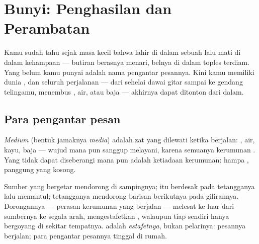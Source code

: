 \chapter{Bunyi: Penghasilan dan Perambatan}\label{ch:g7:sound-production}

Kamu sudah tahu sejak masa kecil bahwa  lahir di dalam sebuah
 lalu mati di dalam kehampaan --- butiran berasnya menari,
belnya di dalam toples terdiam. Yang belum kamu punyai adalah nama
pengantar pesannya. Kini kamu memiliki dunia , dan seluruh
perjalanan  --- dari sehelai dawai gitar sampai ke gendang
telingamu, menembus , air, atau baja --- akhirnya dapat ditonton
dari dalam.

\section{Para pengantar pesan}

\begin{definition}[Medium]\label{def:g7:sound-production:medium}
\emph{Medium} (bentuk jamaknya \emph{media}) adalah zat
yang dilewati  ketika berjalan: , air, kayu, baja --- wujud
mana pun sanggup melayani, karena semuanya kerumunan . Yang
tidak dapat diseberangi  mana pun adalah ketiadaan kerumunan:
hampa , panggung yang kosong.
\end{definition}

\begin{proposition}\label{prop:g7:sound-production:travel}
Sumber yang bergetar mendorong  di sampingnya;  itu
berdesak pada tetangganya lalu memantul; tetangganya mendorong barisan
berikutnya pada gilirannya. Dorongannya --- perasan kerumunan yang
berjalan --- melesat ke luar dari sumbernya ke segala arah, 
mengestafetkan , walaupun tiap  sendiri hanya bergoyang
di sekitar tempatnya.  adalah \emph{estafetnya}, bukan
pelarinya: pesannya berjalan; para pengantar pesannya tinggal di rumah.
\end{proposition}

